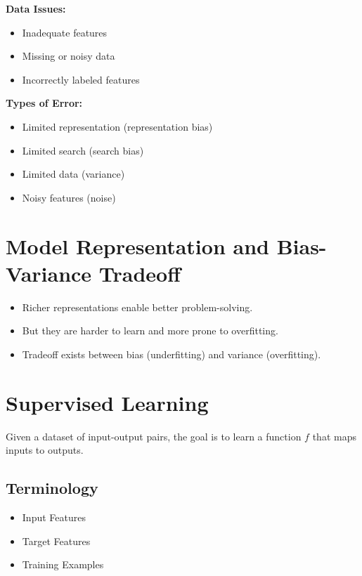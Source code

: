 \textbf{Data Issues:}

\begin{itemize}
    \item Inadequate features
    \item Missing or noisy data
    \item Incorrectly labeled features
\end{itemize}

\textbf{Types of Error:}

\begin{itemize}
    \item Limited representation (representation bias)
    \item Limited search (search bias)
    \item Limited data (variance)
    \item Noisy features (noise)
\end{itemize}

\section{Model Representation and Bias-Variance Tradeoff}

\begin{itemize}
    \item Richer representations enable better problem-solving.
    \item But they are harder to learn and more prone to overfitting.
    \item Tradeoff exists between bias (underfitting) and variance (overfitting).
\end{itemize}

\section{Supervised Learning}

Given a dataset of input-output pairs, the goal is to learn a function $f$ that maps inputs to outputs.

\subsection{Terminology}

\begin{itemize}
    \item Input Features
    \item Target Features
    \item Training Examples
\end{itemize}

